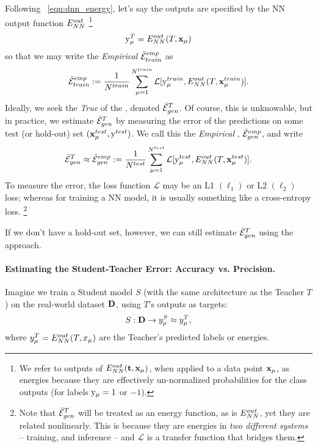 Following \EQN~\ref{eqn:dnn_energy}, let's say the \Teacher outputs are specified by
the NN output  function $E^{out}_{NN}$
\footnote{
We refer to outputs of $E^{out}_{NN}({\mathbf{t}},\mathbf{x}_{\mu} )$, when applied to a data point $\mathbf{x}_{\mu}$, as energies because they are effectively un-normalized probabilities for the class outputs (for labels $\mathrm{y}_{\mu}=1$ or $-1$).  }
\begin{align}
\label{eqn:T_ENN}
\mathrm{y}_{\mu}^{T}=E^{out}_{NN}(T,\mathbf{x}_{\mu}) 
\end{align}
so that we may write the \emph{Empirical} \AverageTrainingError
$\bar{\mathcal{E}}^{emp}_{train}$
as 
\begin{align}
\label{eqn:Eg_train}
\bar{\mathcal{E}}^{emp}_{train}:= \frac{1}{N^{train}}\sum_{\mu=1}^{N^{train}}\mathcal{L}[\mathrm{y}_{\mu}^{train},E^{out}_{NN}(T,\mathbf{x}_{\mu}^{train})]  .
\end{align}
Ideally, we seek the \emph{True} \AverageGeneralizationError of the \Teacher, denoted  $\bar{\mathcal{E}}_{gen}^{T}$. 
Of course, this is unknowable, but in practice, we estimate $\bar{\mathcal{E}}_{gen}^{T}$ 
by measuring the error of the \Teacher predictions on some test (or hold-out) set $(\mathbf{x}_{\mu}^{test}, \mathrm{y}^{test})$.
We call this the \emph{Empirical \AverageGeneralizationError}, $\bar{\mathcal{E}}^{emp}_{gen}$, and write
\begin{align}
\label{eqn:Eg_test}
 \bar{\mathcal{E}}_{gen}^{T}\approx \bar{\mathcal{E}}^{emp}_{gen}:= \frac{1}{N^{test}}\sum_{\mu=1}^{N^{test}}\mathcal{L}[\mathrm{y}_{\mu}^{test},E^{out}_{NN}(T,\mathbf{x}_{\mu}^{test})] .
\end{align}
To measure the error, the loss function $\mathcal{L}$ may be an L1 $(\ell_1)$ or L2 $(\ell_2)$ loss;
whereas for training a NN model, it is usually something like a cross-entropy loss.
\footnote{Note that $\bar{\mathcal{E}}_{gen}^{T}$ will be treated as an energy function, as is $E^{out}_{NN}$, yet they are related nonlinearly. This is because they are energies in \emph{two different systems} -- training, and inference -- and $\mathcal{L}$ is a transfer function that bridges them.}

If we don't have a hold-out set, however, we can still estimate $\bar{\mathcal{E}}_{gen}^{T}$ using the \StudentTeacher approach.

\paragraph{Estimating the Student-Teacher Error: Accuracy vs. Precision.}
Imagine we train a Student model $S$ (with the same architecture as the Teacher $T$) on the real-world dataset $\mathbf{D}$, using $T$'s outputs as targets:
\begin{equation*}
S: \mathbf{D} \to y^{S}_\mu \approx y^{T}_\mu,
\label{eqn:S_ENN}
\end{equation*}
where $y^T_\mu = E^{out}_{NN}(T, x_\mu)$ are the Teacher’s predicted labels or energies.

